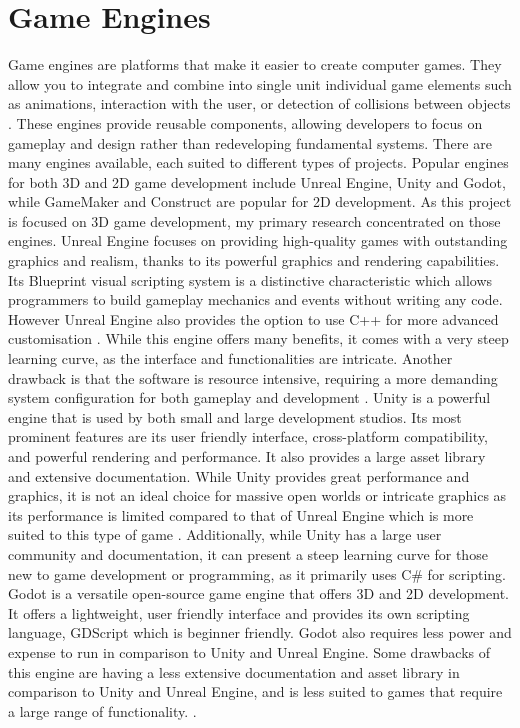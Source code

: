 \documentclass[10pt]{final_report}
\begin{document}
\section{Game Engines}
Game engines are platforms that make it easier to create computer games. They allow you to integrate and combine into single unit individual game elements such as animations, interaction with the user, or detection of collisions between objects \cite{Barczak2019}. These engines provide reusable components, allowing developers to focus on gameplay and design rather than redeveloping fundamental systems. There are many engines available, each suited to different types of projects. Popular engines for both 3D and 2D game development include Unreal Engine, Unity and Godot, while GameMaker and Construct are popular for 2D development. As this project is focused on 3D game development, my primary research concentrated on those engines.
\newline
Unreal Engine focuses on providing high-quality games with outstanding graphics and realism, thanks to its powerful graphics and rendering capabilities. Its Blueprint visual scripting system is a distinctive characteristic which allows programmers to build gameplay mechanics and events without writing any code. However Unreal Engine also provides the option to use C++ for more advanced customisation \cite{eventyr_2023}. While this engine offers many benefits, it comes with a very steep learning curve, as the interface and functionalities are intricate. Another drawback is that the software is resource intensive, requiring a more demanding system configuration for both gameplay and development \cite{eventyr_2023}. 
\newline
Unity is a powerful engine that is used by both small and large development studios. Its most prominent features are its user friendly interface, cross-platform compatibility, and powerful rendering and performance. It also provides a large asset library and extensive documentation. While Unity provides great performance and graphics, it is not an ideal choice for massive open worlds or intricate graphics as its performance is limited compared to that of Unreal Engine which is more suited to this type of game \cite{medium_2024}. Additionally, while Unity has a large user community and documentation, it can present a steep learning curve for those new to game development or programming, as it primarily uses C\# for scripting.
\newline
Godot is a versatile open-source game engine that offers 3D and 2D development. It offers a lightweight, user friendly interface and provides its own scripting language, GDScript which is beginner friendly. Godot also requires less power and expense to run in comparison to Unity and Unreal Engine. Some drawbacks of this engine are having a less extensive documentation and asset library in comparison to Unity and Unreal Engine, and is less suited to games that require a large range of functionality. \cite{hatton_2024}. \newline
\end{document}
